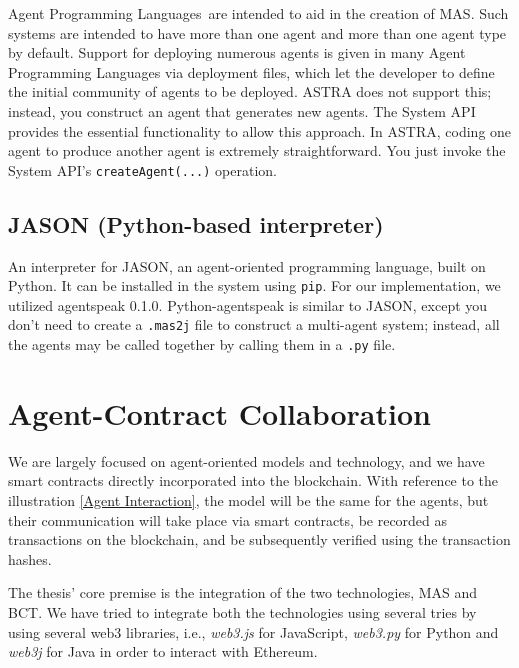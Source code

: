  \vspace{.5cm}
 
Agent Programming Languages are intended to aid in the creation of \ac{MAS}. Such systems are intended to have more than one agent and more than one agent type by default. Support for deploying numerous agents is given in many Agent Programming Languages via deployment files, which let the developer to define the initial community of agents to be deployed. \ac{ASTRA} does not support this; instead, you construct an agent that generates new agents. The System \ac{API} provides the essential functionality to allow this approach. In \ac{ASTRA}, coding one agent to produce another agent is extremely straightforward. You just invoke the System \ac{API}'s \texttt{createAgent(...)} operation.

\subsection{JASON (Python-based interpreter)}

An interpreter for JASON, an agent-oriented programming language, built on Python. It can be installed in the system using \texttt{\ac{pip}}. For our implementation, we utilized agentspeak 0.1.0. Python-agentspeak is similar to JASON, except you don't need to create a \texttt{.mas2j} file to construct a multi-agent system; instead, all the agents may be called together by calling them in a \texttt{.py} file.


\section{Agent-Contract Collaboration}

 
 We are largely focused on agent-oriented models and technology, and we have smart contracts directly incorporated into the blockchain. With reference to the illustration \ref{Agent Interaction}, the model will be the same for the agents, but their communication will take place via smart contracts, be recorded as transactions on the blockchain, and be subsequently verified using the transaction hashes.
 
 \vspace{.5cm}

The thesis' core premise is the integration of the two technologies, \ac{MAS} and \ac{BCT}. We have tried to integrate both the technologies using several tries by using several web3 libraries, i.e., \textit{web3.js} for JavaScript, \textit{web3.py} for Python and \textit{web3j} for Java in order to interact with Ethereum.


